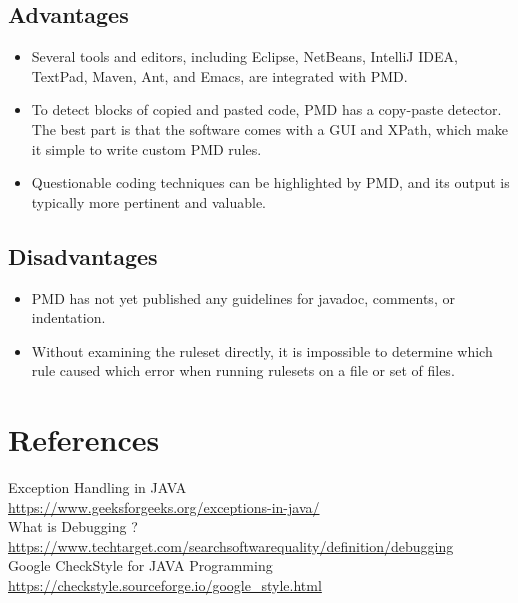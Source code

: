 \documentclass[a4paper, 11pt]{article}
\begin{document}
\subsection{Advantages}
\begin{itemize}
    \item{Several tools and editors, including Eclipse, NetBeans, IntelliJ IDEA, TextPad, Maven, Ant, and Emacs, are integrated with PMD.}
    
    \item{To detect blocks of copied and pasted code, PMD has a copy-paste detector. The best part is that the software comes with a GUI and XPath, which make it simple to write custom PMD rules.}
    
    \item{Questionable coding techniques can be highlighted by PMD, and its output is typically more pertinent and valuable.}
\end{itemize}

\subsection{Disadvantages}

\begin{itemize}
    \item{PMD has not yet published any guidelines for javadoc, comments, or indentation.}
    
    \item{Without examining the ruleset directly, it is impossible to determine which rule caused which error when running rulesets on a file or set of files.}
\end{itemize}

\newpage
\section{References}
Exception Handling in JAVA\\
\href{https://www.geeksforgeeks.org/exceptions-in-java/}{https://www.geeksforgeeks.org/exceptions-in-java/}
\\

\noindent
What is Debugging ? \\
\href{https://www.techtarget.com/searchsoftwarequality/definition/debugging}{https://www.techtarget.com/searchsoftwarequality/definition/debugging}\\

\noindent
Google CheckStyle for JAVA Programming\\
\href{https://checkstyle.sourceforge.io/google\_style.html}{https://checkstyle.sourceforge.io/google\_style.html}\\
\end{document}
